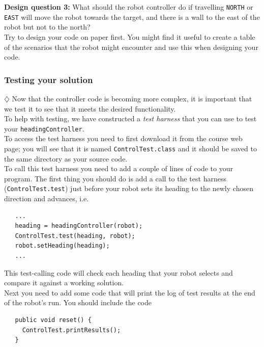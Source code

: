 \noindent
{\bf Design question 3:} What should the robot controller do if travelling
{\tt NORTH} or {\tt EAST} will move the robot towards the target, and there 
is a wall to the east of the robot but not to the north? \\

\noindent
Try to design your code on paper first. You might find it useful to create
a table of the scenarios that the robot might encounter and use this when 
designing your code.

\subsubsection{Testing your solution}

$\diamondsuit$ Now that the controller code is becoming more complex, it is 
important that we test it to see that it meets the desired functionality. \\

\noindent
To help with testing, we have constructed a {\em test harness} that you can
use to 
test your {\tt headingController}.  \\

\noindent
To access the test harness you need to first download it from the 
course web page; you will see that it is named {\tt ControlTest.class}
and it should be saved to the same directory as your source code. \\

\noindent
To call this test harness you need to add a couple of lines of code to 
your program. The first thing you should do is add a call to the test 
harness ({\tt ControlTest.test}) just before your robot sets its heading to the newly
chosen direction and advances, i.e.  

\begin{verbatim}
   ...
   heading = headingController(robot);
   ControlTest.test(heading, robot);
   robot.setHeading(heading);
   ...
\end{verbatim}

\noindent
This test-calling code will check each heading that your robot selects 
and compare it against a working solution. \\

\noindent
Next you need to add some code that will print the log of test results at 
the end of the robot's run. You should include the code

\begin{verbatim}
   public void reset() {
     ControlTest.printResults();
   }
\end{verbatim}

